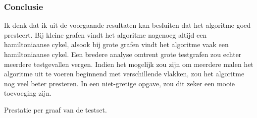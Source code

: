 \documentclass[11pt, a4paper, table]{article}
\theoremstyle{definition}
\theoremstyle{definition}
\theoremstyle{definition}
\begin{document}
\subsubsection{Conclusie}
Ik denk dat ik uit de voorgaande resultaten kan besluiten dat het algoritme goed presteert. Bij kleine grafen vindt het algoritme nagenoeg altijd een hamiltoniaanse cykel, alsook bij grote grafen vindt het algoritme vaak een hamiltoniaanse cykel. Een bredere analyse omtrent grote testgrafen zou echter meerdere testgevallen vergen. Indien het mogelijk zou zijn om meerdere malen het algoritme uit te voeren beginnend met verschillende vlakken, zou het algoritme nog veel beter presteren. In een niet-gretige opgave, zou dit zeker een mooie toevoeging zijn. 
\begin{table}
	\center
	\caption{Prestatie per graaf van de testset.}
	\label{table:analysis}

\end{table}
 
\end{document}
